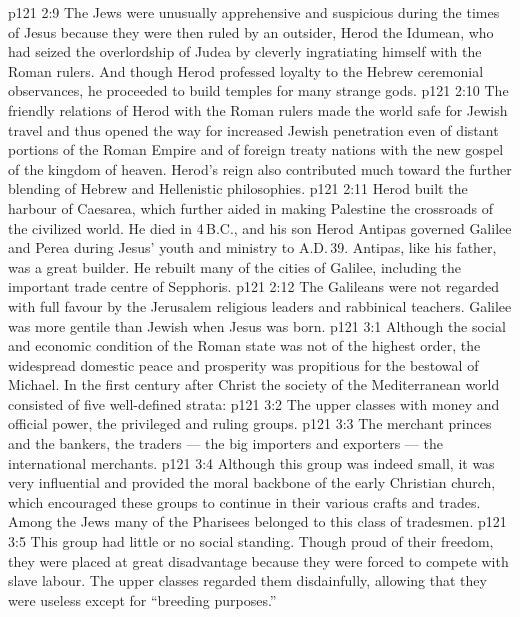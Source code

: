 \vs p121 2:9 \pc The Jews were unusually apprehensive and suspicious during the times of Jesus because they were then ruled by an outsider, Herod the Idumean, who had seized the overlordship of Judea by cleverly ingratiating himself with the Roman rulers. And though Herod professed loyalty to the Hebrew ceremonial observances, he proceeded to build temples for many strange gods.
\vs p121 2:10 The friendly relations of Herod with the Roman rulers made the world safe for Jewish travel and thus opened the way for increased Jewish penetration even of distant portions of the Roman Empire and of foreign treaty nations with the new gospel of the kingdom of heaven. Herod’s reign also contributed much toward the further blending of Hebrew and Hellenistic philosophies.
\vs p121 2:11 Herod built the harbour of Caesarea, which further aided in making Palestine the crossroads of the civilized world. He died in 4\,B.C., and his son Herod Antipas governed Galilee and Perea during Jesus’ youth and ministry to A.D.\,39. Antipas, like his father, was a great builder. He rebuilt many of the cities of Galilee, including the important trade centre of Sepphoris.
\vs p121 2:12 The Galileans were not regarded with full favour by the Jerusalem religious leaders and rabbinical teachers. Galilee was more gentile than Jewish when Jesus was born.
\vs p121 3:1 Although the social and economic condition of the Roman state was not of the highest order, the widespread domestic peace and prosperity was propitious for the bestowal of Michael. In the first century after Christ the society of the Mediterranean world consisted of five well\hyp{}defined strata:
\vs p121 3:2 \bibnobreakspace {} The upper classes with money and official power, the privileged and ruling groups.
\vs p121 3:3 \bibnobreakspace {} The merchant princes and the bankers, the traders --- the big importers and exporters --- the international merchants.
\vs p121 3:4 \bibnobreakspace {} Although this group was indeed small, it was very influential and provided the moral backbone of the early Christian church, which encouraged these groups to continue in their various crafts and trades. Among the Jews many of the Pharisees belonged to this class of tradesmen.
\vs p121 3:5 \bibnobreakspace {} This group had little or no social standing. Though proud of their freedom, they were placed at great disadvantage because they were forced to compete with slave labour. The upper classes regarded them disdainfully, allowing that they were useless except for “breeding purposes.”
